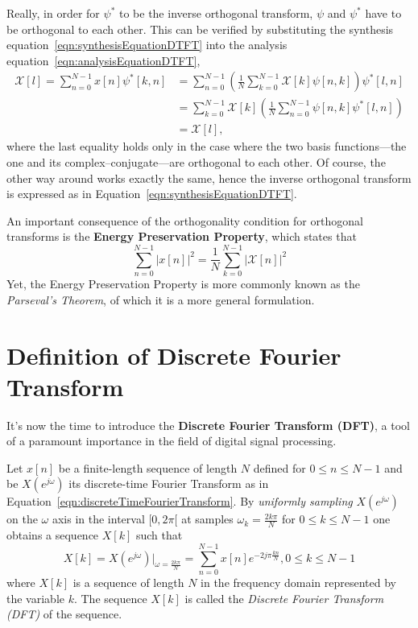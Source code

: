 \documentclass[\documentfontsize, twocolumn]{\classname}
\begin{document}
Really, in order for $\psi^*$ to be the inverse orthogonal transform, $\psi$ and $\psi^*$ have to be orthogonal to each other. This can be verified by substituting the synthesis equation~\ref{eqn:synthesisEquationDTFT} into the analysis equation~\ref{eqn:analysisEquationDTFT},
\begin{align*}
    	\mathcal X[l] = \sum_{n=0}^{N-1} x[n] \psi^*[k,n] &= \sum_{n=0}^{N-1}\left( \frac 1 N \sum_{k=0}^{N-1} \mathcal X[k] \psi[n,k]\right)\psi^*[l,n] \\
                                      &= \sum_{k=0}^{N-1} \mathcal X[k] \left( \frac 1 N \sum_{n=0}^{N-1}\psi[n,k]\psi^*[l,n]\right) \\
                                      &= \mathcal X[l],
\end{align*}
where the last equality holds only in the case where the two basis functions---the one and its com\-plex--con\-ju\-ga\-te---are orthogonal to each other. Of course, the other way around works exactly the same, hence the inverse orthogonal transform is expressed as in Equation~\ref{eqn:synthesisEquationDTFT}.

An important consequence of the orthogonality condition for orthogonal transforms is the \textbf{Energy Preservation Property}, which states that
\begin{equation}\label{eqn:energyPreservationProperty}
    \sum_{n=0}^{N-1}|x[n]|^2 = \frac 1 N \sum_{k=0}^{N-1}\left|\mathcal X[n]\right|^2
\end{equation}
Yet, the Energy Preservation Property is more commonly known as the \emph{Parseval's Theorem}, of which it is a more general formulation.

\section{Definition of Discrete Fourier Transform}

It's now the time to introduce the \textbf{Discrete Fourier Transform (DFT)}, a tool of a paramount importance in the field of digital signal processing.

\begin{defin}
    Let $x[n]$ be a finite-length sequence of length $N$ defined for $0 \leq n \leq N-1$ and be $X(e^{j\omega})$ its discrete-time Fourier Transform as in Equation~\ref{eqn:discreteTimeFourierTransform}. By \emph{uniformly sampling} $X(e^{j\omega})$ on the $\omega$ axis in the interval $[0, 2\pi[$ at samples $\omega_k=\frac{2k\pi}{N}$ for $0 \leq k \leq N-1$ one obtains a sequence $X[k]$ such that
    \begin{equation}\label{eqn:discreteFourierTransform}
        X[k] = X(e^{j\omega})\Bigr\rvert_{\omega = \frac {2k\pi}{N}} = \sum_{n=0}^{N-1} x[n] e^{-2j\pi \frac{k n}{N}}, 0 \leq k \leq N-1
    \end{equation}
    where $X[k]$ is a sequence of length $N$ in the frequency domain represented by the variable $k$. The sequence $X[k]$ is called the \emph{Discrete Fourier Transform (DFT)} of the sequence.
\end{defin}
\end{document}
